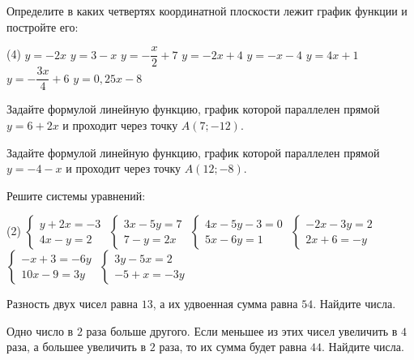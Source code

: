 \begin{class}[number=7]
	\begin{listofex}
		\item Определите в каких четвертях координатной плоскости лежит график функции и постройте его:
		\begin{tasks}(4)
			\task \( y=-2x \)
			\task \( y=3-x \)
			\task \( y=-\dfrac{ x }{ 2 }+7 \)
			\task \( y=-2x+4 \)
			\task \( y=-x-4 \)
			\task \( y=4x+1 \)
			\task \( y=-\dfrac{ 3x }{ 4 }+6 \)
			\task \( y=0,25x-8 \)
		\end{tasks}
		\item Задайте формулой линейную функцию, график которой параллелен прямой \(y=6+2x\) и проходит через точку \(A(7; -12)\).
		\item Задайте формулой линейную функцию, график которой параллелен прямой \(y=-4-x\) и проходит через точку \(A(12; -8)\).
		\item Решите системы уравнений:
		\begin{tasks}(2)
			\task \( \begin{cases} y+2x=-3 \\ 4x-y=2 \end{cases} \)
			\task \( \begin{cases} 3x-5y=7 \\ 7-y=2x \end{cases} \)
			\task \( \begin{cases} 4x-5y-3=0 \\ 5x-6y=1 \end{cases} \)
			\task \( \begin{cases} -2x-3y=2 \\ 2x+6=-y \end{cases} \)
			\task \( \begin{cases} -x+3=-6y \\ 10x-9=3y \end{cases} \)
			\task \( \begin{cases} 3y-5x=2 \\ -5+x=-3y \end{cases} \)
		\end{tasks}
		\item Разность двух чисел равна \(13\), а их удвоенная сумма равна \(54\). Найдите числа.
		\item Одно число в \(2\) раза больше другого. Если меньшее из этих чисел увеличить в \(4\) раза, а большее увеличить в \(2\) раза, то их сумма будет равна \(44\). Найдите числа.

\end{listofex}
\end{class}
